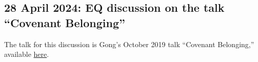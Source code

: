 				
				
	
	\subsection{28 April 2024: EQ discussion on the talk ``Covenant Belonging''}
		\label{TALKS-28-04-2024}
		
		The talk for this discussion is Gong's October 2019 talk ``Covenant Belonging,'' available \href{https://www.churchofjesuschrist.org/study/general-conference/2019/10/41gong?lang=eng}{here}.
		
